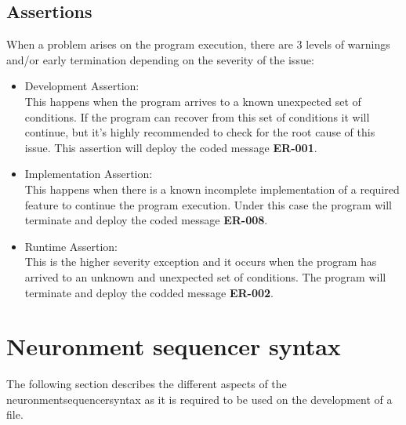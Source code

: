 \subsection{Assertions}

When a problem arises on the program execution, there are 3 levels of warnings and/or early termination depending on the severity of the issue:
\begin{itemize}
  \item Development Assertion:\\
  This happens when the program arrives to a known unexpected set of conditions. If the program can recover from this set of conditions it will continue, but it's highly recommended to check for the root cause of this issue. This assertion will deploy the coded message \textbf{ER-001}. \lotharcl
  \item Implementation Assertion:\\
  This happens when there is a known incomplete implementation of a required feature to continue the program execution. Under this case the program will terminate and deploy the coded message \textbf{ER-008}. \lotharcl
  \item Runtime Assertion:\\
  This is the higher severity exception and it occurs when the program has arrived to an unknown and unexpected set of conditions. The program will terminate and deploy the codded message \textbf{ER-002}. \lotharcl
\end{itemize}

\section{Neuronment sequencer syntax}

The following section describes the different aspects of the \gls{neuronmentsequencersyntax} as it is required to be used on the development of a  file.

